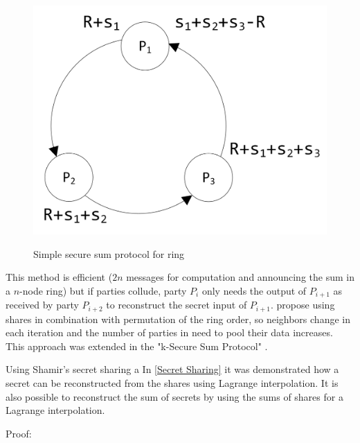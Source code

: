 		\begin{figure}[!htb] %
		\caption{Simple secure sum protocol for ring}
		\includegraphics[scale=1.0]{figures/smpc-sum-simple-ring.png}
		\label{figure:smpc sum ring}
		\end{figure}
		
		This method is efficient ($2n$ messages for computation and announcing the sum in a $n$-node ring) but if parties collude, party $P_i$ only needs the output of $P_{i+1}$ as received by party $P_{i+2}$ to reconstruct the secret input of $P_{i+1}$. \textcite{Clifton2002} propose using shares in combination with permutation of the ring order, so neighbors change in each iteration and the number of parties in need to pool their data increases. This approach was extended in the "k-Secure Sum Protocol" \autocite{Sheikh2009}.
		
		Using Shamir's secret sharing a 		
		In \ref{Secret Sharing} it was demonstrated how a secret can be reconstructed from the shares using Lagrange interpolation. It is also possible to reconstruct the sum of secrets by using the sums of shares for a Lagrange interpolation.
		
		Proof:
		

